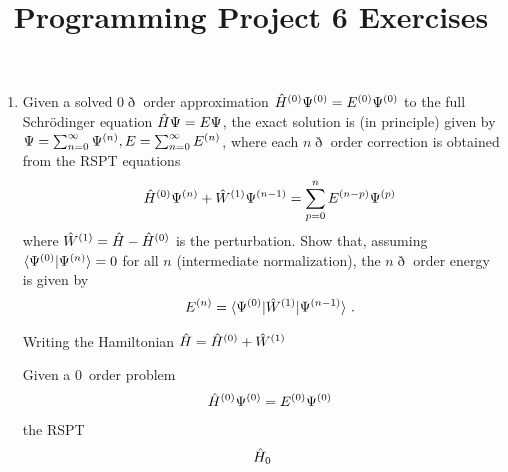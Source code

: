 \documentclass[fleqn,11pt]{article}
\title{Programming Project 6 Exercises}
\author{}
\date{}
\begin{document}
\maketitle

\begin{enumerate}
  \item
  Given a solved $0\eth$ order approximation $\hat{H}^{(0)}\Psi^{(0)}=E^{(0)}\Psi^{(0)}$ to the full Schr\"odinger equation $\hat{H}\Psi=E\Psi$, the exact solution is (in principle) given by $\Psi=\sum_{n=0}^{\infty}\Psi^{(n)}, E=\sum_{n=0}^{\infty}E^{(n)}$, where each $n\eth$ order correction is obtained from the RSPT equations
\begin{align*}
&&
  \hat{H}^{(0)}\Psi^{(n)}
+
  \hat{W}^{(1)}\Psi^{(n-1)}
=
  \sum_{p=0}^n
  E^{(n-p)}\Psi^{(p)}
\end{align*}
where $\hat{W}^{(1)}=\hat{H}-\hat{H}^{(0)}$ is the perturbation.
Show that, assuming $\langle\Psi^{(0)}|\Psi^{(n)}\rangle=0$ for all $n$ (intermediate normalization), the $n\eth$ order energy is given by
\begin{align}
&&
  E^{(n)}
=
  \langle\Psi^{(0)}|\hat{W}^{(1)}|\Psi^{(n-1)}\rangle\ .
\end{align}

  Writing the Hamiltonian $\hat{H}=\hat{H}^{(0)}+\hat{W}^{(1)}$
  
  Given a 0\eth\ order problem
\begin{align*}
&&
  \hat{H}^{(0)}\Psi^{(0)}
=
  E^{(0)}\Psi^{(0)}
\end{align*}
the RSPT 
\begin{align*}
  \hat{H}_0
\end{align*}
\end{enumerate}
\end{document}
